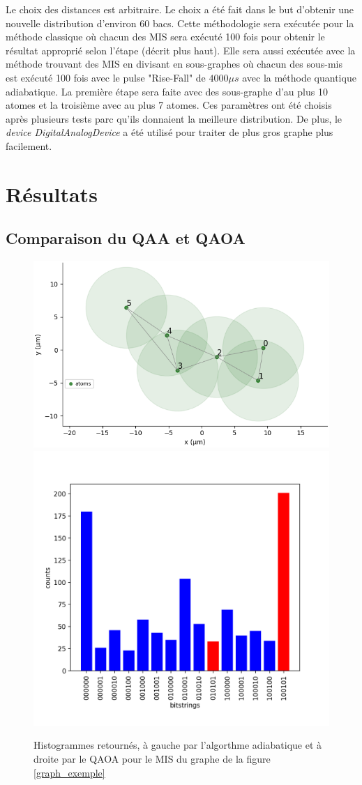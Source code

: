 \documentclass[11pt]{article}
\begin{document}
Le choix des distances est arbitraire. Le choix a été fait dans le but d'obtenir une nouvelle distribution d'environ 60 bacs.
Cette méthodologie sera exécutée pour la méthode classique où chacun des MIS sera exécuté 100 fois pour obtenir le résultat approprié selon l'étape (décrit plus haut).
Elle sera aussi exécutée avec la méthode trouvant des MIS en divisant en sous-graphes où chacun des sous-mis est exécuté 100 fois avec le pulse  "Rise-Fall" de $4000 \mu s$ avec la méthode quantique adiabatique. La première étape sera faite avec des sous-graphe d'au plus 10 atomes et la troisième avec au plus 7 atomes. Ces paramètres ont été choisis après plusieurs tests parc qu'ils donnaient la meilleure distribution. De plus, le \textit{device DigitalAnalogDevice} a été utilisé pour traiter de plus gros graphe plus facilement.



\section{Résultats}
\subsection{Comparaison du QAA et QAOA}
\begin{figure}[H]
    \centering
    \includegraphics[width = 0.48\linewidth]{images/registre_exemple2.png}
    \includegraphics[width=0.49\linewidth]{images/qaoa_res.png}
    \caption{Histogrammes retournés, à gauche par l'algorthme adiabatique et à droite par le QAOA pour le MIS du graphe de la figure \ref{graph_exemple}}
    \label{qaoavsqaa}
\end{figure}
\end{document}
